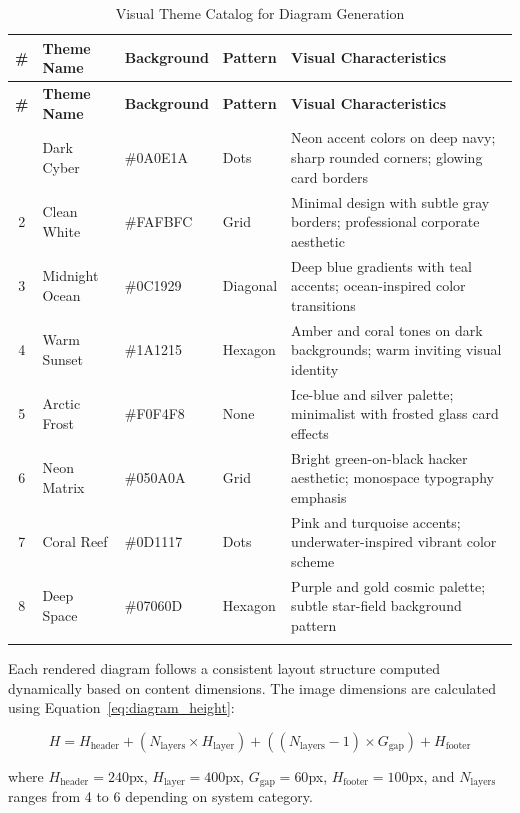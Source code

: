 \documentclass[a4paper,12pt,openany]{report}
\begin{document}
\begin{longtable}{|c|l|l|l|p{5cm}|}
\hline
\textbf{\#} & \textbf{Theme Name} & \textbf{Background} & \textbf{Pattern} & \textbf{Visual Characteristics} \\
\hline
\endfirsthead
\hline
\textbf{\#} & \textbf{Theme Name} & \textbf{Background} & \textbf{Pattern} & \textbf{Visual Characteristics} \\
\hline
\endhead
\hline
\endfoot
1 & Dark Cyber & \#0A0E1A & Dots & Neon accent colors on deep navy; sharp rounded corners; glowing card borders \\
\hline
2 & Clean White & \#FAFBFC & Grid & Minimal design with subtle gray borders; professional corporate aesthetic \\
\hline
3 & Midnight Ocean & \#0C1929 & Diagonal & Deep blue gradients with teal accents; ocean-inspired color transitions \\
\hline
4 & Warm Sunset & \#1A1215 & Hexagon & Amber and coral tones on dark backgrounds; warm inviting visual identity \\
\hline
5 & Arctic Frost & \#F0F4F8 & None & Ice-blue and silver palette; minimalist with frosted glass card effects \\
\hline
6 & Neon Matrix & \#050A0A & Grid & Bright green-on-black hacker aesthetic; monospace typography emphasis \\
\hline
7 & Coral Reef & \#0D1117 & Dots & Pink and turquoise accents; underwater-inspired vibrant color scheme \\
\hline
8 & Deep Space & \#07060D & Hexagon & Purple and gold cosmic palette; subtle star-field background pattern \\
\hline

\caption{Visual Theme Catalog for Diagram Generation}
\label{tab:themes}
\end{longtable}

Each rendered diagram follows a consistent layout structure computed dynamically based on content dimensions. The image dimensions are calculated using Equation~\ref{eq:diagram_height}:

\begin{equation}
H = H_{\text{header}} + (N_{\text{layers}} \times H_{\text{layer}}) + ((N_{\text{layers}} - 1) \times G_{\text{gap}}) + H_{\text{footer}}
\label{eq:diagram_height}
\end{equation}

where $H_{\text{header}} = 240$px, $H_{\text{layer}} = 400$px, $G_{\text{gap}} = 60$px, $H_{\text{footer}} = 100$px, and $N_{\text{layers}}$ ranges from 4 to 6 depending on system category.
\end{document}
